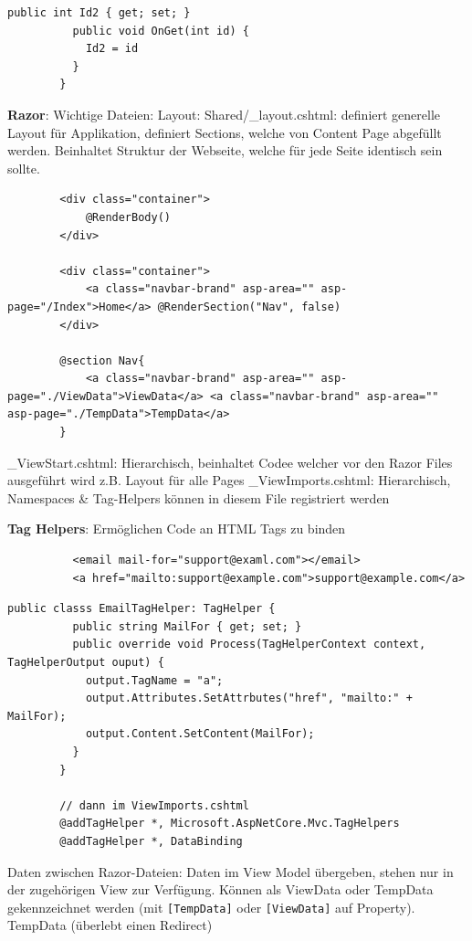 \documentclass[10pt,landscape]{article}
\begin{document}
\begin{multicols}{2}
\begin{lstlisting}[style=CSharp]
          public int Id2 { get; set; }
          public void OnGet(int id) {
            Id2 = id
          }
        }
        \end{lstlisting}

        \textbf{Razor}: Wichtige Dateien: Layout: Shared/\_layout.cshtml: definiert generelle Layout für Applikation, definiert Sections, welche von Content Page abgefüllt werden.
        Beinhaltet Struktur der Webseite, welche für jede Seite identisch sein sollte.

        \begin{lstlisting}
        <div class="container">
            @RenderBody()
        </div>

        <div class="container">
            <a class="navbar-brand" asp-area="" asp-page="/Index">Home</a> @RenderSection("Nav", false)
        </div>

        @section Nav{
            <a class="navbar-brand" asp-area="" asp-page="./ViewData">ViewData</a> <a class="navbar-brand" asp-area="" asp-page="./TempData">TempData</a>
        }
        \end{lstlisting}

        \_ViewStart.cshtml: Hierarchisch, beinhaltet Codee welcher vor den Razor Files ausgeführt wird z.B. Layout für alle Pages
        \_ViewImports.cshtml: Hierarchisch, Namespaces \& Tag-Helpers können in diesem File registriert werden

        \textbf{Tag Helpers}: Ermöglichen Code an HTML Tags zu binden
        \begin{lstlisting}
          <email mail-for="support@examl.com"></email>
          <a href="mailto:support@example.com">support@example.com</a>
        \end{lstlisting}\begin{lstlisting}[style=CSharp]
        public classs EmailTagHelper: TagHelper {
          public string MailFor { get; set; }
          public override void Process(TagHelperContext context, TagHelperOutput ouput) {
            output.TagName = "a";
            output.Attributes.SetAttrbutes("href", "mailto:" + MailFor);
            output.Content.SetContent(MailFor);
          }
        }

        // dann im ViewImports.cshtml
        @addTagHelper *, Microsoft.AspNetCore.Mvc.TagHelpers
        @addTagHelper *, DataBinding
        \end{lstlisting}

        Daten zwischen Razor-Dateien: Daten im View Model übergeben, stehen nur in der zugehörigen View zur Verfügung.
        Können als ViewData oder TempData gekennzeichnet werden (mit \lstinline{[TempData]} oder \lstinline{[ViewData]} auf Property).
        TempData (überlebt einen Redirect)


\end{multicols}
\end{document}
